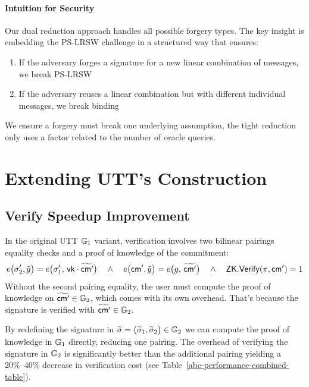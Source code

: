 \paragraph{Intuition for Security}
Our dual reduction approach handles all possible forgery types. The key insight is embedding the PS-LRSW challenge in a structured way that ensures:
\begin{enumerate}
    \item If the adversary forges a signature for a new linear combination of messages, we break PS-LRSW
    \item If the adversary reuses a linear combination but with different individual messages, we break binding
\end{enumerate}
We ensure a forgery must break one underlying assumption, the tight reduction only uses a factor related to the number of oracle queries. 








\section{Extending UTT's Construction}\label{chap2:extending_utt_construction}



\subsection{Verify Speedup Improvement}\label{subsec:g2_verify_speedup}

In the original UTT $\mathbb{G}_1$ variant, verification involves two bilinear pairings equality checks and a proof of knowledge of the commitment:
$$
e\bigl(\sigma_{2}',\tilde g\bigr)
= e\bigl(\sigma_{1}',\,\mathsf{vk}\cdot\widetilde{\mathsf{cm}'}\bigr) \quad \wedge 
\quad
e\bigl(\mathsf{cm}',\tilde g\bigr)
= e\bigl(g,\,\widetilde{\mathsf{cm}'}\bigr)
\quad \wedge \quad \mathsf{ZK.Verify}(\pi,\mathsf{cm}')=1
$$
Without the second pairing equality, the user must compute the proof of knowledge on $\widetilde{\mathsf{cm}'} \in \mathbb{G}_2$, which comes with its own overhead. That's because the signature is verified with $\widetilde{\mathsf{cm}'} \in \mathbb{G}_2$.

By redefining the signature in $\widetilde\sigma = \bigl(\widetilde\sigma_1,\widetilde\sigma_2\bigr)\in\mathbb{G}_2$ we can compute the proof of knowledge in $\mathbb{G}_1$ directly, reducing one pairing. The overhead of verifying the signature in $\mathbb{G}_2$ is significantly better than the additional pairing yielding a $20\%\text{--}40\%$ decrease in verification cost (see Table~\ref{abc-performance-combined-table}).

